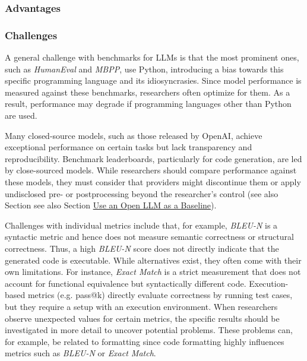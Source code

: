 \subsubsection{Advantages}


\subsubsection{Challenges}

A general challenge with benchmarks for LLMs is that the most prominent ones, such as \emph{HumanEval} and \emph{MBPP}, use Python, introducing a bias towards this specific programming language and its idiosyncrasies.
Since model performance is measured against these benchmarks, researchers often optimize for them.
As a result, performance may degrade if programming languages other than Python are used.

Many closed-source models, such as those released by OpenAI, achieve exceptional performance on certain tasks but lack transparency and reproducibility.
Benchmark leaderboards, particularly for code generation, are led by close-sourced models.
While researchers should compare performance against these models, they must consider that providers might discontinue them or apply undisclosed pre- or postprocessing beyond the researcher's control (see also Section see also Section \href{/guidelines/#use-an-open-llm-as-a-baseline}{Use an Open LLM as a Baseline}).

Challenges with individual metrics include that, for example, \emph{BLEU-N} is a syntactic metric and hence does not measure semantic correctness or structural correctness.
Thus, a high \emph{BLEU-N} score does not directly indicate that the generated code is executable.
While alternatives exist, they often come with their own limitations.
For instance, \emph{Exact Match} is a strict measurement that does not account for functional equivalence but syntactically different code.
Execution-based metrics (e.g. pass@k) directly evaluate correctness by running test cases, but they require a setup with an execution environment.
When researchers observe unexpected values for certain metrics, the specific results should be investigated in more detail to uncover potential problems.
These problems can, for example, be related to formatting since code formatting highly influences metrics such as \emph{BLEU-N} or \emph{Exact Match}.

